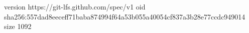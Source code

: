 version https://git-lfs.github.com/spec/v1
oid sha256:557dad8eeceff71baba874994f64a53b055a40054cf837a3b28e77ccdc949014
size 1092
